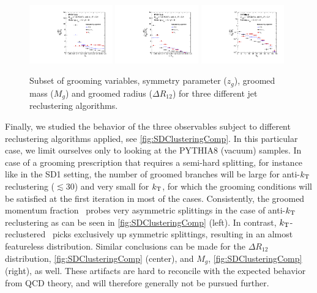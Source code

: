\begin{figure}[th]
\centering
\includegraphics[width=0.32\textwidth]
{figures/SDAlgorithms/zgClusteringComp.pdf}
\includegraphics[width=0.32\textwidth]
{figures/SDAlgorithms/rgClusteringComp.pdf}
\includegraphics[width=0.32\textwidth]
{figures/SDAlgorithms/mgClusteringComp.pdf}%
\caption{Subset of grooming variables, symmetry parameter ($z_{g}$), groomed mass ($M_{g}$) and groomed radius ($\Delta R_{12}$) for three different jet reclustering algorithms.}
\label{fig:SDClusteringComp}
\end{figure}
Finally, we studied the behavior of the three observables subject to different reclustering algorithms applied, see \autoref{fig:SDClusteringComp}. In this particular case, we limit ourselves only to looking at the PYTHIA8 (vacuum) samples.
In case of a grooming prescription that requires a semi-hard splitting, for instance like in the SD1 setting,
the number of groomed branches will be large for anti-$k_{\rm \tiny T}$ reclustering ($\lesssim 30$) and very small for $k_{\rm \tiny T}$, for which the grooming conditions will be satisfied at the first iteration in most of the cases. Consistently, the groomed momentum fraction \zg\, probes very asymmetric splittings in the case of anti-$k_{\rm \tiny T}$ reclustering as can be seen in \autoref{fig:SDClusteringComp} (left). In contrast, $k_{\rm \tiny T}$-reclustered \zg\, picks exclusively up symmetric splittings, resulting in an almost featureless distribution. Similar conclusions can be made for the $\Delta R_{12}$ distribution, \autoref{fig:SDClusteringComp} (center), and $M_g$, \autoref{fig:SDClusteringComp} (right), as well. These artifacts are hard to reconcile with the expected behavior from QCD theory, and will therefore generally not be pursued further.


